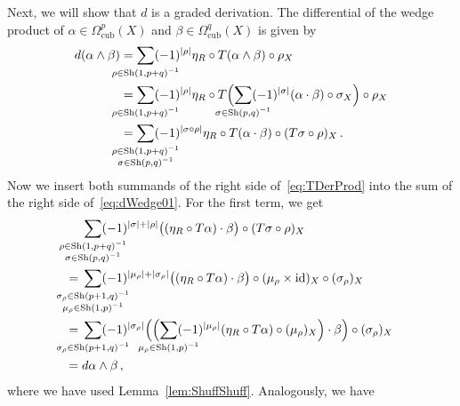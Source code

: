\documentclass[12pt,reqno, a4paper]{amsart}
\numberwithin{equation}{section}
\theoremstyle{plain}
\theoremstyle{definition}
\theoremstyle{remark}
\DeclareMathOperator{\Shuff}{Sh}
\newcommand{\id}{\mathrm{id}}
\newcommand{\Val}{\eta}
\begin{document}
Next, we will show that $d$ is a graded derivation. The differential of the wedge product of $\alpha \in \Omega^p_\mathrm{cub}(X)$ and $\beta \in \Omega^q_\mathrm{cub}(X)$ is given by
\begin{equation}
\label{eq:dWedge01}
\begin{split}
  d(\alpha \wedge \beta)
  &=
  \sum_{\mathclap{\rho \in \Shuff(1,p+q)^{-1} }}
  (-1)^{|\rho|}\Val_R \circ T(\alpha \wedge \beta) \circ \rho_X
  \\
  &=
  \sum_{\mathclap{\rho \in \Shuff(1,p+q)^{-1} }}
  (-1)^{|\rho|}\Val_R \circ T
  \Bigl(
  \sum_{\mathclap{\sigma \in \Shuff(p,q)^{-1}}} (-1)^{|\sigma|}
  (\alpha \cdot \beta) \circ \sigma_X
  \Bigr) \circ \rho_X
  \\
  &=
  \sum_{
    \mathclap{
      \substack{
        \rho \in \Shuff(1,p+q)^{-1} \\
        \sigma \in \Shuff(p,q)^{-1}
      }
    }
  }
  (-1)^{|\sigma \circ \rho|}\Val_R \circ T
  (\alpha \cdot \beta) \circ (T\sigma \circ \rho)_X
  \,.
\end{split}
\end{equation}
Now we insert both summands of the right side of~\eqref{eq:TDerProd} into the sum of the right side of~\eqref{eq:dWedge01}. For the first term, we get
\begin{equation}
\label{eq:dWedge02}
\begin{split}
  &
  \sum_{
    \mathclap{
      \substack{
        \rho \in \Shuff(1,p+q)^{-1} \\
        \sigma \in \Shuff(p,q)^{-1}
      }
    }
  }
  (-1)^{|\sigma| + |\rho|}
  \bigl( (\Val_R \circ T\alpha) \cdot \beta \bigr) \circ (T\sigma \circ \rho)_X
  \\
  ={}&
  \sum_{
    \mathclap{
      \substack{
        \sigma_\rho \in \Shuff(p+1,q)^{-1} \\
        \mu_\rho \in \Shuff(1,p)^{-1}
      }
    }
  }
  (-1)^{|\mu_\rho| + |\sigma_\rho|}
  \bigl( (\Val_R \circ T\alpha) \cdot \beta \bigr) \circ
  (\mu_\rho \times \id)_X \circ (\sigma_\rho)_X
  \\
  ={}&
  \sum_{\mathclap{\sigma_\rho \in \Shuff(p+1,q)^{-1}}}
  (-1)^{|\sigma_\rho|}
  \Bigl(\Bigl( \sum_{\mathclap{\mu_\rho \in \Shuff(1,p)^{-1}}} (-1)^{|\mu_\rho|}
    (\Val_R \circ T\alpha) \circ (\mu_\rho)_X \Bigr)\cdot \beta \Bigr) \circ
  (\sigma_\rho)_X
  \\
  ={}&
  d\alpha \wedge \beta
  \,,
\end{split}
\end{equation}
where we have used Lemma~\ref{lem:ShuffShuff}. Analogously, we have
\end{document}
